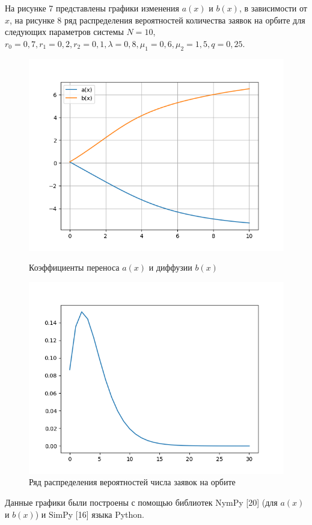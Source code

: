 На рисунке 7 представлены графики изменения $a(x)$ и $b(x)$, в зависимости от $x$, на рисунке 8 ряд распределения вероятностей количества заявок на орбите для следующих параметров системы $N=10$, $r_{0}=0,7, r_{1}=0,2, r_{2}=0,1, \lambda=0,8, \mu_{1}=0,6, \mu_{2}=1,5, q=0,25.$
\begin{figure}[H]
	\centering
	\begin{minipage}[h]{0.49\linewidth}
		\includegraphics[width=0.8\linewidth]{ab10} 	
		\caption{Коэффициенты переноса $a(x)$ и диффузии $b(x)$}
		\label{ris:experimoriginal}
	\end{minipage}
	\hfill
	\begin{minipage}[h]{0.49\linewidth}
		\includegraphics[width=0.8\linewidth]{P10} 
		\caption{Ряд распределения вероятностей числа заявок на орбите}
		\label{ris:experimcoded}
	\end{minipage}
\end{figure}

Данные графики были построены с помощью библиотек NymPy [20] (для $a(x)$ и $b(x)$) и SimPy [16] языка Python.
